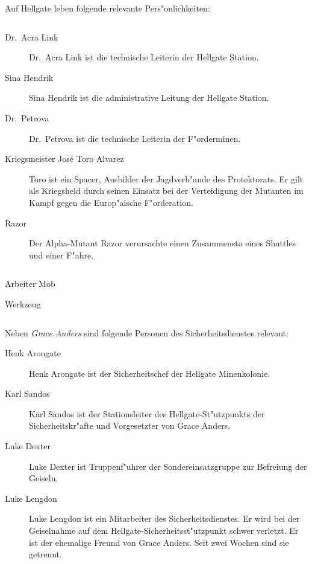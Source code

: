 
Auf Hellgate leben folgende relevante Pers"onlichkeiten:

\begin{column}[l]{0.45}
    \begin{description}
        \item[Dr.~Acra Link] Dr.~Acra Link ist die technische Leiterin der Hellgate Station.
        \item[Sina Hendrik] Sina Hendrik ist die administrative Leitung der Hellgate Station.
        \item[Dr.~Petrova] Dr.~Petrova ist die technische Leiterin der F"orderminen.
        \item[Kriegsmeister Jos\'{e} \frqq{}Toro\flqq{} Alvarez] Toro ist ein Spacer, Ausbilder der Jagdverb"ande des Protektorats. Er gilt 
            als Kriegsheld durch seinen Einsatz bei der Verteidigung der Mutanten im Kampf gegen die Europ"aische F"orderation.
        \item[Razor] Der Alpha-Mutant Razor verursachte einen Zusammensto\3 eines Shuttles und einer F"ahre.
    \end{description}
\end{column}
\begin{column}[r]{0.45}
    \begin{nscsheet}[h]{Arbeiter Mob}
        \nscstats[]
        \nscruler
        \begin{nscinventory}
            \nscitem[Waffen] Werkzeug
        \end{nscinventory}
    \end{nscsheet}
\end{column}


Neben \emph{Grace Anders} sind folgende Personen des Sicherheitsdienstes relevant:

\begin{description}
    \item[Henk Arongate] Henk Arongate ist der Sicherheitschef der Hellgate Minenkolonie.
    \item[Karl Sandos] Karl Sandos ist der Stationsleiter des Hellgate-St"utzpunkts der Sicherheitskr"afte und Vorgesetzter von Grace 
        Anders.
    \item[Luke Dexter] Luke Dexter ist Truppenf"uhrer der Sondereinsatzgruppe zur Befreiung der Geiseln.
    \item[Luke Lengdon] Luke Lengdon ist ein Mitarbeiter des Sicherheitsdienstes. Er wird bei der Geiselnahme auf dem 
        Hellgate-Sicherheitsst"utzpunkt schwer verletzt. Er ist der ehemalige Freund von Grace Anders. Seit zwei Wochen sind sie getrennt.
\end{description}

\vfill\pagebreak